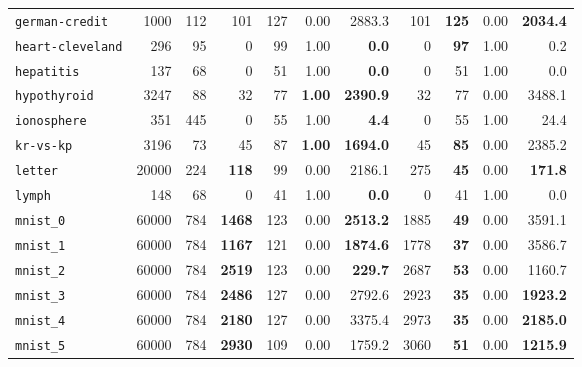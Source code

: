 \begin{tabular}{lccrrrrrrrr}
\texttt{german-credit} & \multicolumn{1}{r}{1000} & \multicolumn{1}{r}{112}  & 101 & 127 & 0.00 & 2883.3 & 101 & \textbf{125} & 0.00 & \textbf{2034.4}\\
\texttt{heart-cleveland} & \multicolumn{1}{r}{296} & \multicolumn{1}{r}{95}  & 0 & 99 & 1.00 & \textbf{0.0} & 0 & \textbf{97} & 1.00 & 0.2\\
\texttt{hepatitis} & \multicolumn{1}{r}{137} & \multicolumn{1}{r}{68}  & 0 & 51 & 1.00 & \textbf{0.0} & 0 & 51 & 1.00 & 0.0\\
\texttt{hypothyroid} & \multicolumn{1}{r}{3247} & \multicolumn{1}{r}{88}  & 32 & 77 & \textbf{1.00} & \textbf{2390.9} & 32 & 77 & 0.00 & 3488.1\\
\texttt{ionosphere} & \multicolumn{1}{r}{351} & \multicolumn{1}{r}{445}  & 0 & 55 & 1.00 & \textbf{4.4} & 0 & 55 & 1.00 & 24.4\\
\texttt{kr-vs-kp} & \multicolumn{1}{r}{3196} & \multicolumn{1}{r}{73}  & 45 & 87 & \textbf{1.00} & \textbf{1694.0} & 45 & \textbf{85} & 0.00 & 2385.2\\
\texttt{letter} & \multicolumn{1}{r}{20000} & \multicolumn{1}{r}{224}  & \textbf{118} & 99 & 0.00 & 2186.1 & 275 & \textbf{45} & 0.00 & \textbf{171.8}\\
\texttt{lymph} & \multicolumn{1}{r}{148} & \multicolumn{1}{r}{68}  & 0 & 41 & 1.00 & \textbf{0.0} & 0 & 41 & 1.00 & 0.0\\
\texttt{mnist\_0} & \multicolumn{1}{r}{60000} & \multicolumn{1}{r}{784}  & \textbf{1468} & 123 & 0.00 & \textbf{2513.2} & 1885 & \textbf{49} & 0.00 & 3591.1\\
\texttt{mnist\_1} & \multicolumn{1}{r}{60000} & \multicolumn{1}{r}{784}  & \textbf{1167} & 121 & 0.00 & \textbf{1874.6} & 1778 & \textbf{37} & 0.00 & 3586.7\\
\texttt{mnist\_2} & \multicolumn{1}{r}{60000} & \multicolumn{1}{r}{784}  & \textbf{2519} & 123 & 0.00 & \textbf{229.7} & 2687 & \textbf{53} & 0.00 & 1160.7\\
\texttt{mnist\_3} & \multicolumn{1}{r}{60000} & \multicolumn{1}{r}{784}  & \textbf{2486} & 127 & 0.00 & 2792.6 & 2923 & \textbf{35} & 0.00 & \textbf{1923.2}\\
\texttt{mnist\_4} & \multicolumn{1}{r}{60000} & \multicolumn{1}{r}{784}  & \textbf{2180} & 127 & 0.00 & 3375.4 & 2973 & \textbf{35} & 0.00 & \textbf{2185.0}\\
\texttt{mnist\_5} & \multicolumn{1}{r}{60000} & \multicolumn{1}{r}{784}  & \textbf{2930} & 109 & 0.00 & 1759.2 & 3060 & \textbf{51} & 0.00 & \textbf{1215.9}\\

\end{tabular}
